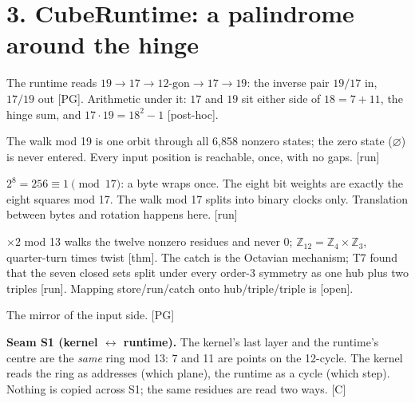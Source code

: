 \documentclass[11pt,a4paper]{article}
\newcommand{\stamp}[1]{\textsf{\small[#1]}}
\newcommand{\E}{\varnothing}
\begin{document}
\section*{3. CubeRuntime: a palindrome around the hinge}
The runtime reads $19\to17\to12\text{-gon}\to17\to19$: the inverse pair $19/17$ in, $17/19$ out \stamp{PG}. Arithmetic under it: $17$ and $19$ sit either side of $18=7+11$, the hinge sum, and $17\cdot19=18^2-1$ \stamp{post-hoc}.
\begin{description}[leftmargin=1.6em,style=nextline]
\item[19 in] The walk mod 19 is one orbit through all 6,858 nonzero states; the zero state ($\E$) is never entered. Every input position is reachable, once, with no gaps. \stamp{run}
\item[17 translate] $2^8=256\equiv1\pmod{17}$: a byte wraps once. The eight bit weights are exactly the eight squares mod 17. The walk mod 17 splits into binary clocks only. Translation between bytes and rotation happens here. \stamp{run}
\item[12-gon: store, run, catch] $\times2$ mod 13 walks the twelve nonzero residues and never 0; $\mathbb Z_{12}=\mathbb Z_4\times\mathbb Z_3$, quarter-turn times twist \stamp{thm}. The catch is the Octavian mechanism; T7 found that the seven closed sets split under every order-3 symmetry as one hub plus two triples \stamp{run}. Mapping store/run/catch onto hub/triple/triple is \stamp{open}.
\item[17 store out, lift \;/\; 19 out] The mirror of the input side. \stamp{PG}
\end{description}
\textbf{Seam S1 (kernel $\leftrightarrow$ runtime).} The kernel's last layer and the runtime's centre are the \emph{same} ring mod 13: 7 and 11 are points on the 12-cycle. The kernel reads the ring as addresses (which plane), the runtime as a cycle (which step). Nothing is copied across S1; the same residues are read two ways. \stamp{C}
\end{document}
